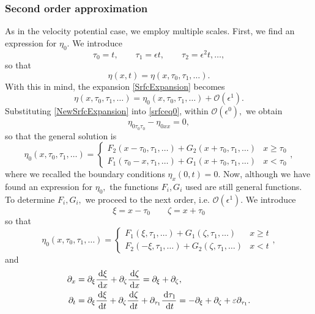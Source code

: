 \documentclass[10pt,reqno,oneside,a4paper, landscape]{article}
\begin{document}
\subsubsection*{Second order approximation}
As in the velocity potential case, we employ multiple scales. First, we find an expression for $\eta_0.$  We introduce 
\[ \tau_0 = t, \qquad \tau_1 = \epsilon t, \qquad \tau_2 = \epsilon^2 t, \ldots, \]
so that 
\[ \eta(x, t) = \eta(x, \tau_0, \tau_1, \ldots). \]
With this in mind, the expansion \eqref{SrfcExpansion} becomes
\begin{equation}\label{NewSrfcExpansion}
\eta(x, \tau_0, \tau_1, \ldots) = \eta_0(x, \tau_0, \tau_1, \ldots) + \mathcal{O}(\epsilon^1).
\end{equation}
Substituting \eqref{NewSrfcExpansion} into \eqref{srfceq0}, within $\mathcal{O}(\epsilon^0),$ we obtain
\begin{equation}\label{1stOrderApprox}
\eta_{0\tau_0 \tau_0} - \eta_{0xx} = 0,
\end{equation}
so that the general solution is 
\[ \eta_0(x, \tau_0, \tau_1, \ldots ) = \begin{cases} F_2(x-\tau_0, \tau_1, \ldots ) + G_2(x+\tau_0, \tau_1, \ldots) & x\geq \tau_0 \\ F_1(\tau_0-x, \tau_1, \ldots ) + G_1(x+\tau_0, \tau_1, \ldots) & x<\tau_0 \end{cases}, \]
where we recalled the boundary conditions $\eta_x(0,t) = 0.$
Now, although we have found an expression for $\eta_0,$ the functions $F_i, G_i$ used are still general functions. To determine $F_i,G_i,$ we proceed to the next order, i.e. $\mathcal{O}(\epsilon^1).$ We introduce
\[ 
\xi = x-\tau_0 \qquad \zeta = x+ \tau_0
\]
so that 
\[ \eta_0(x, \tau_0, \tau_1, \ldots ) = \begin{cases} F_1(\xi, \tau_1, \ldots ) + G_1(\zeta, \tau_1, \ldots) & x\geq t \\ F_2(-\xi, \tau_1, \ldots ) + G_2(\zeta, \tau_1, \ldots) & x<t \end{cases}, \]
and
\begin{align*}
\partial_x &= \partial_\xi \frac{\,\mathrm{d} \xi}{\,\mathrm{d} x} + \partial_\zeta \frac{\,\mathrm{d} \zeta}{\,\mathrm{d} x} =\partial_\xi + \partial_\zeta, \\
\partial_t &= \partial_\xi \frac{\,\mathrm{d} \xi}{\,\mathrm{d} t} + \partial_\zeta \frac{\,\mathrm{d} \zeta}{\,\mathrm{d} t} + \partial_{\tau_1}\frac{\,\mathrm{d} \tau_1}{\,\mathrm{d} t} = - \partial_\xi + \partial_\zeta + \varepsilon \partial_{\tau_1}.
\end{align*}

\end{document}
